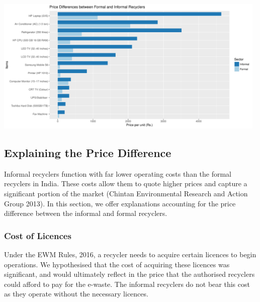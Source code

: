 \documentclass[a4paper, 12pt]{article}
\begin{document}
                    \includegraphics[width=0.98\textwidth]{myfile}
                    
                    
                    \subsection{Explaining the Price Difference}
                    
                    Informal recyclers function with far lower operating costs than the formal recyclers in India. These costs allow them to quote higher prices and capture a significant portion of the market (Chintan Environmental Research and Action Group 2013). In this section, we offer explanations accounting for the price difference between the informal and formal recyclers. \\
                    
                    \subsubsection{Cost of Licences}
                    
                    Under the EWM Rules, 2016, a recycler needs to acquire certain licences to begin operations. We hypothesised that the cost of acquiring these licences was significant, and would ultimately reflect in the price that the authorised recyclers could afford to pay for the e-waste. The informal recyclers do not bear this cost as they operate without the necessary licences. \\
                    
\end{document}
